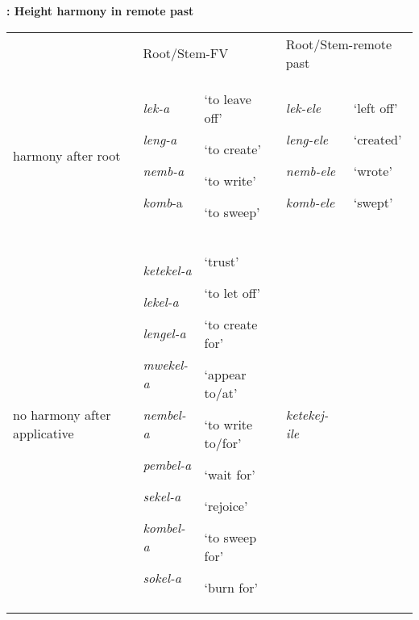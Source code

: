 \documentclass[output=paper]{langsci/langscibook}
\begin{document}
\begin{styleBodyTextIndent}
\textbf{: Height harmony in remote past}
\end{styleBodyTextIndent}

\begin{tabular}{lllll} & \multicolumn{2}{l}{\mdseries Root/Stem-FV} & \multicolumn{2}{l}{\mdseries Root/Stem-remote past}\\
\lsptoprule
\mdseries harmony after root & {\mdseries \emph{lek-a}}

{\mdseries \emph{leng-a}}

{\mdseries \emph{nemb-a  }}

{\mdseries \emph{komb}{}-a} & {\mdseries ‘to leave off’}

{\mdseries ‘to create’}

{\mdseries ‘to write’}

{\mdseries ‘to sweep’} & {\mdseries \emph{lek-ele}}

{\mdseries \emph{leng-ele}}

{\mdseries \emph{nemb-ele}}

{\mdseries \emph{komb-ele}} & {\mdseries ‘left off’}

{\mdseries ‘created’}

{\mdseries ‘wrote’}

{\mdseries ‘swept’}\\
\mdseries no harmony after applicative & {\mdseries \emph{ketekel-a}}

{\mdseries \emph{lekel-a}}

{\mdseries \emph{lengel-a}}

{\mdseries \emph{mwekel-a}}

{\mdseries \emph{nembel-a}}

{\mdseries \emph{pembel-a}}

{\mdseries \emph{sekel-a}}

{\mdseries \emph{kombel-a}}

\mdseries \emph{sokel-a} & {\mdseries ‘trust’}

{\mdseries ‘to let off’}

{\mdseries ‘to create for’}

{\mdseries ‘appear to/at’}

{\mdseries ‘to write to/for’}

{\mdseries ‘wait for’}

{\mdseries ‘rejoice’}

{\mdseries ‘to sweep for’}

\mdseries ‘burn for’ & {\mdseries \emph{ketekej-ile}}


\end{tabular}
\end{document}

